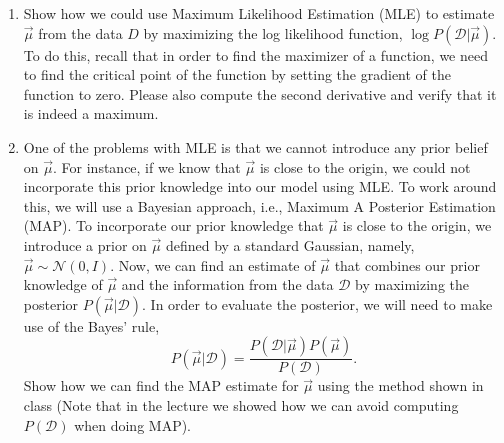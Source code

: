 \documentclass[11pt]{article}
\begin{document}
		\begin{enumerate}
			\item Show how we could use Maximum Likelihood Estimation (MLE) to estimate $\vec{\mu}$ from the data $D$ by maximizing the log likelihood function, $\log P(\mathcal{D} | \vec{\mu})$. To do this, recall that in order to find the maximizer of a function, we need to find the critical point of the function by setting the gradient of the function to zero. Please also compute the second derivative and verify that it is indeed a maximum.  
			\item One of the problems with MLE is that we cannot introduce any prior belief on $\vec{\mu}$. For instance, if we know that $\vec{\mu}$ is close to the origin, we could not incorporate this prior knowledge into our model using MLE. To work around this, we will use a Bayesian approach, i.e., Maximum A Posterior Estimation (MAP). 
			To incorporate our prior knowledge that $\vec{\mu}$ is close to the origin, we introduce a prior on $\vec{\mu}$ defined by a  standard Gaussian, namely, $\vec{\mu} \sim \mathcal{N}(0, I)$. Now, we can find an estimate of $\vec{\mu}$ that combines our prior knowledge of $\vec{\mu}$ and the information from the data $\mathcal{D}$ by maximizing the posterior $P(\vec{\mu} | \mathcal{D})$. In order to evaluate the posterior, we will need to make use of the Bayes' rule, 
			$$P(\vec{\mu} | \mathcal{D}) = \frac{P(\mathcal{D} | \vec{\mu})P(\vec{\mu})}{P(\mathcal{D})}.$$ Show how we can find the MAP estimate for $\vec{\mu}$ using the method shown in class (Note that in the lecture we showed how we can avoid computing ${P(\mathcal{D})}$ when doing MAP).
			
			
			

\end{enumerate}
\end{document}
